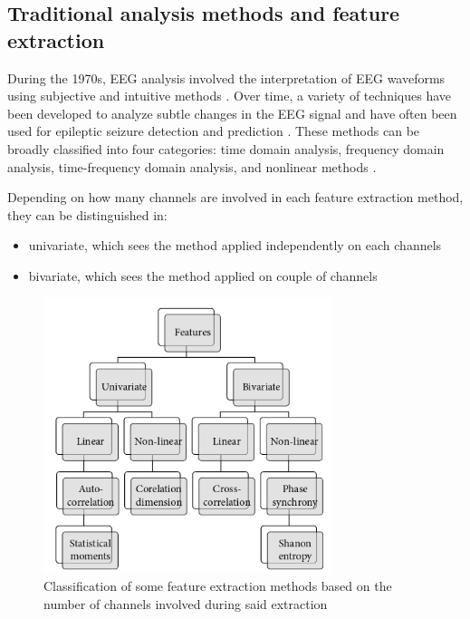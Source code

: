 \subsection{Traditional analysis methods and feature extraction}
During the 1970s, EEG analysis involved the interpretation of \gls{EEG} waveforms using subjective and intuitive methods \cite{callaway_coupling_1974}. Over time, a variety of techniques have been developed to analyze subtle changes in the \gls{EEG} signal and have often been used for epileptic seizure detection and prediction \cite{natu_review_2022}. These methods can be broadly classified into four categories: time domain analysis, frequency domain analysis, time-frequency domain analysis, and nonlinear methods \cite{acharya_automated_2013}.

Depending on how many channels are involved in each feature extraction method, they can be distinguished in:
\begin{itemize}
    \item univariate, which sees the method applied independently on each channels
    \item bivariate, which sees the method applied on couple of channels
\end{itemize}

\begin{figure}[ht]
    \centering
    \includegraphics[width=0.75\textwidth]{images/State-of-art/univariate-bivariate-feature-extraction.png}
    \caption{Classification of some feature extraction methods based on the number of channels involved during said extraction \cite{natu_review_2022}}
    \label{fig:univariate-bivariate-feature-extraction}
\end{figure}

